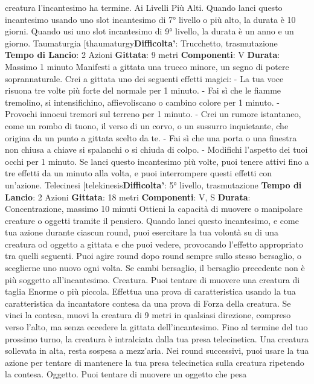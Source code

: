 \begin{multicols}{2}
creatura l’incantesimo ha termine.
Ai Livelli Più Alti. Quando lanci questo incantesimo
usando uno slot incantesimo di 7° livello o più alto, la
durata è 10 giorni. Quando usi uno slot incantesimo di
9° livello, la durata è un anno e un giorno.
Taumaturgia
[thaumaturgy\textbf{Difficolta'}:
Trucchetto, trasmutazione
\textbf{Tempo di Lancio}: 2 Azioni
\textbf{Gittata}: 9 metri
\textbf{Componenti}: V
\textbf{Durata}: Massimo 1 minuto
Manifesti a gittata una trucco minore, un segno di
potere soprannaturale. Crei a gittata uno dei seguenti
effetti magici:
- La tua voce risuona tre volte più forte del normale
per 1 minuto.
- Fai sì che le fiamme tremolino, si intensifichino,
affievoliscano o cambino colore per 1 minuto.
- Provochi innocui tremori sul terreno per 1 minuto.
- Crei un rumore istantaneo, come un rombo di tuono,
il verso di un corvo, o un sussurro inquietante, che
origina da un punto a gittata scelto da te.
- Fai sì che una porta o una finestra non chiusa a
chiave si spalanchi o si chiuda di colpo.
- Modifichi l’aspetto dei tuoi occhi per 1 minuto.
Se lanci questo incantesimo più volte, puoi tenere attivi
fino a tre effetti da un minuto alla volta, e puoi
interrompere questi effetti con un’azione.
Telecinesi
[telekinesis\textbf{Difficolta'}:
5° livello, trasmutazione
\textbf{Tempo di Lancio}: 2 Azioni
\textbf{Gittata}: 18 metri
\textbf{Componenti}: V, S
\textbf{Durata}: Concentrazione, massimo 10 minuti
Ottieni la capacità di muovere o manipolare creature o
oggetti tramite il pensiero. Quando lanci questo
incantesimo, e come tua azione durante ciascun round,
puoi esercitare la tua volontà su di una creatura od
oggetto a gittata e che puoi vedere, provocando l’effetto
appropriato tra quelli seguenti. Puoi agire round dopo
round sempre sullo stesso bersaglio, o sceglierne uno
nuovo ogni volta. Se cambi bersaglio, il bersaglio
precedente non è più soggetto all’incantesimo.
Creatura. Puoi tentare di muovere una creatura di
taglia Enorme o più piccola. Effettua una prova di
caratteristica usando la tua caratteristica da incantatore
contesa da una prova di Forza della creatura. Se vinci
la contesa, muovi la creatura di 9 metri in qualsiasi
direzione, compreso verso l’alto, ma senza eccedere la
gittata dell’incantesimo. Fino al termine del tuo
prossimo turno, la creatura è intralciata dalla tua presa
telecinetica. Una creatura sollevata in alta, resta
sospesa a mezz’aria.
Nei round successivi, puoi usare la tua azione per
tentare di mantenere la tua presa telecinetica sulla
creatura ripetendo la contesa.
Oggetto. Puoi tentare di muovere un oggetto che pesa

\end{multicols}
